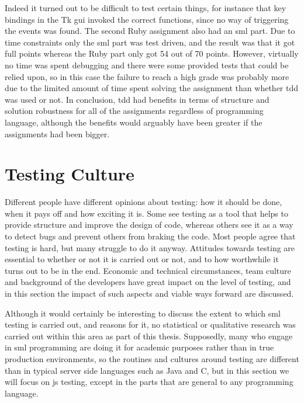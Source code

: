 \documentclass[11pt]{article}
\begin{document}
Indeed it turned out to be difficult to test certain things, for instance that key bindings in the Tk \gls{gui} invoked the correct functions, since no way of triggering the events was found. The second Ruby assignment also had an \gls{sml} part. Due to time constraints only the \gls{sml} part was test driven, and the result was that it got full points whereas the Ruby part only got 54 out of 70 points. However, virtually no time was spent debugging and there were some provided tests that could be relied upon, so in this case the failure to reach a high grade was probably more due to the limited amount of time spent solving the assignment than whether \gls{tdd} was used or not.
In conclusion, \gls{tdd} had benefits in terms of structure and solution robustness for all of the assignments regardless of programming language, although the benefits would arguably have been greater if the assignments had been bigger.


\section{Testing Culture}
\label{sec:testingculture}

Different people have different opinions about testing: how it should be done, when it pays off and how exciting it is. Some see testing as a tool that helps to provide structure and improve the design of code, whereas others see it as a way to detect bugs and prevent others from braking the code. Most people agree that testing is hard, but many struggle to do it anyway. Attitudes towards testing are essential to whether or not it is carried out or not, and to how worthwhile it turns out to be in the end. Economic and technical circumstances, team culture and background of the developers have great impact on the level of testing, and in this section the impact of such aspects and viable ways forward are discussed.

Although it would certainly be interesting to discuss the extent to which \gls{sml} testing is carried out, and reasons for it, no statistical or qualitative research was carried out within this area as part of this thesis. Supposedly, many who engage in \gls{sml} programming are doing it for academic purposes rather than in true production environments, so the routines and cultures around testing are different than in typical server side languages such as Java and C\nolinebreak\hspace{-.05em}\raisebox{.3ex}{\scriptsize\bf \#}, but in this section we will focus on \gls{js} testing, except in the parts that are general to any programming language.
\end{document}
